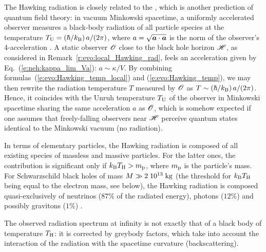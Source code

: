 \begin{remark}
The Hawking radiation is closely related to the
, which is another prediction of quantum field theory:
in vacuum Minkowski spacetime, a uniformly accelerated observer measures a black-body radiation
of all particle species at the temperature $T_{\rm U} = (\hbar/k_{\rm B}) \, a / (2\pi)$, where
$a = \sqrt{\bm{a}\cdot\bm{a}}$ is the norm of the observer's 4-acceleration \cite{Unruh76,Wald94,Carro04}.
A static observer $\mathscr{O}$ close to the black hole horizon $\mathscr{H}$, as considered in Remark~\ref{r:evo:local_Hawking_rad},
feels an acceleration given by Eq.~(\ref{e:neh:kappa_lim_Va}): $a \sim \kappa / V$.
By combining formulas~(\ref{e:evo:Hawking_temp_local}) and (\ref{e:evo:Hawking_temp}),
we may then rewrite the radiation temperature $T$ measured by $\mathscr{O}$ as
$T \sim (\hbar/k_{\rm B}) \, a / (2\pi)$. Hence, it coincides with the Unruh temperature $T_{\rm U}$ of
the observer in Minkowski spacetime sharing the same acceleration $a$ as $\mathscr{O}$, which is somehow expected
if one assumes that freely-falling observers near $\mathscr{H}$ perceive quantum states identical to
the Minkowski vacuum (no radiation).
\end{remark}

\begin{remark} \label{r:evo:comp_Hawking_rad}
In terms of elementary particles, the Hawking radiation is composed of
all existing species of massless and massive particles. For the latter ones,
the contribution is significant only if
$k_{\rm B} T_{\rm H} > m_{\rm p}$, where $m_{\rm p}$ is the particle's mass.
For Schwarzschild black holes of mass $M \gg 2\; 10^{13} {\rm\; kg}$ (the threshold
for $k_{\rm B} T_{\rm H}$ being equal to the electron mass, see below), the Hawking radiation
is composed quasi-exclusively of neutrinos ($87\%$ of the radiated energy),
photons ($12\%$) and possibly gravitons ($1\%$) \cite{Page76,ThornZP86}.
\end{remark}

\begin{remark}
The observed radiation spectrum at infinity is not exactly that
of a black body of temperature $T_{\rm H}$: it is corrected
by greybody factors, which take into account the interaction of the radiation
with the spacetime curvature (backscattering).
\end{remark}

